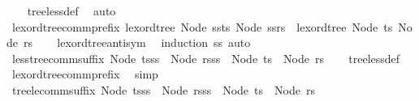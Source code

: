 \begin{isabellebody}
%
\isadelimproof
\ \ %
\endisadelimproof
%
\isatagproof
{}\isamarkupfalse%
\ tree{\isacharunderscore}{\kern0pt}less{\isacharunderscore}{\kern0pt}def\ \isamarkupfalse%
\ auto%
\endisatagproof
{\isafoldproof}%
%
\isadelimproof
\isanewline
%
\endisadelimproof
\isanewline
{}\isamarkupfalse%
\ lexord{\isacharunderscore}{\kern0pt}tree{\isacharunderscore}{\kern0pt}comm{\isacharunderscore}{\kern0pt}prefix{\isacharcolon}{\kern0pt}\ {\isachardoublequoteopen}lexord{\isacharunderscore}{\kern0pt}tree\ {\isacharparenleft}{\kern0pt}Node\ {\isacharparenleft}{\kern0pt}ss{\isacharat}{\kern0pt}ts{\isacharparenright}{\kern0pt}{\isacharparenright}{\kern0pt}\ {\isacharparenleft}{\kern0pt}Node\ {\isacharparenleft}{\kern0pt}ss{\isacharat}{\kern0pt}rs{\isacharparenright}{\kern0pt}{\isacharparenright}{\kern0pt}\ {\isasymlongleftrightarrow}\ lexord{\isacharunderscore}{\kern0pt}tree\ {\isacharparenleft}{\kern0pt}Node\ ts{\isacharparenright}{\kern0pt}\ {\isacharparenleft}{\kern0pt}Node\ rs{\isacharparenright}{\kern0pt}{\isachardoublequoteclose}\isanewline
%
\isadelimproof
\ \ %
\endisadelimproof
%
\isatagproof
{}\isamarkupfalse%
\ lexord{\isacharunderscore}{\kern0pt}tree{\isacharunderscore}{\kern0pt}antisym\ \isamarkupfalse%
\ {\isacharparenleft}{\kern0pt}induction\ ss{\isacharparenright}{\kern0pt}\ auto%
\endisatagproof
{\isafoldproof}%
%
\isadelimproof
\isanewline
%
\endisadelimproof
\isanewline
{}\isamarkupfalse%
\ less{\isacharunderscore}{\kern0pt}tree{\isacharunderscore}{\kern0pt}comm{\isacharunderscore}{\kern0pt}suffix{\isacharcolon}{\kern0pt}\ {\isachardoublequoteopen}Node\ {\isacharparenleft}{\kern0pt}ts{\isacharat}{\kern0pt}ss{\isacharparenright}{\kern0pt}\ {\isacharless}{\kern0pt}\ Node\ {\isacharparenleft}{\kern0pt}rs{\isacharat}{\kern0pt}ss{\isacharparenright}{\kern0pt}\ {\isasymlongleftrightarrow}\ Node\ ts\ {\isacharless}{\kern0pt}\ Node\ rs{\isachardoublequoteclose}\isanewline
%
\isadelimproof
\ \ %
\endisadelimproof
%
\isatagproof
{}\isamarkupfalse%
\ tree{\isacharunderscore}{\kern0pt}less{\isacharunderscore}{\kern0pt}def\ \isamarkupfalse%
\ lexord{\isacharunderscore}{\kern0pt}tree{\isacharunderscore}{\kern0pt}comm{\isacharunderscore}{\kern0pt}prefix\ \isamarkupfalse%
\ simp%
\endisatagproof
{\isafoldproof}%
%
\isadelimproof
\isanewline
%
\endisadelimproof
\isanewline
{}\isamarkupfalse%
\ tree{\isacharunderscore}{\kern0pt}le{\isacharunderscore}{\kern0pt}comm{\isacharunderscore}{\kern0pt}suffix{\isacharcolon}{\kern0pt}\ {\isachardoublequoteopen}Node\ {\isacharparenleft}{\kern0pt}ts{\isacharat}{\kern0pt}ss{\isacharparenright}{\kern0pt}\ {\isasymle}\ Node\ {\isacharparenleft}{\kern0pt}rs{\isacharat}{\kern0pt}ss{\isacharparenright}{\kern0pt}\ {\isasymlongleftrightarrow}\ Node\ ts\ {\isasymle}\ Node\ rs{\isachardoublequoteclose}\isanewline

\end{isabellebody}
